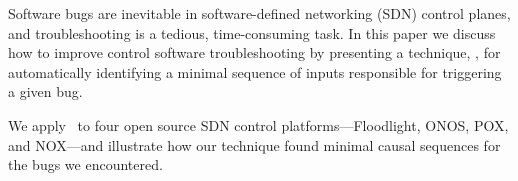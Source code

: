 Software bugs are inevitable in software-defined networking (SDN) control planes,
and troubleshooting
is a tedious, time-consuming task.
In this paper we discuss how to improve
control software troubleshooting by presenting a technique, \simulator,
for automatically identifying
a minimal sequence of inputs responsible for triggering a given bug.

We apply \simulator~to four open source SDN control
platforms---Floodlight, ONOS, POX, and NOX---and
illustrate how our technique found minimal causal sequences for
the bugs we encountered.
